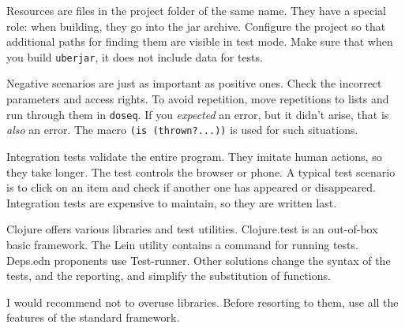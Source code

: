 Resources are files in the project folder of the same name. They have a special role: when building, they go into the jar archive. Configure the project so that additional paths for finding them are visible in test mode. Make sure that when you build \verb|uberjar|, it does not include data for tests.

Negative scenarios are just as important as positive ones. Check the incorrect parameters and access rights. To avoid repetition, move repetitions to lists and run through them in \verb|doseq|. If you \emph{expected} an error, but it didn't arise, that is \emph{also} an error. The macro \verb|(is (thrown?...))| is used for such situations.

Integration tests validate the entire program. They imitate human actions, so they take longer. The test controls the browser or phone. A typical test scenario is to click on an item and check if another one has appeared or disappeared. Integration tests are expensive to maintain, so they are written last.

Clojure offers various libraries and test utilities. Clojure.test is an out-of-box basic framework. The Lein utility contains a command for running tests. Deps.edn proponents use Test-runner. Other solutions change the syntax of the tests, and the reporting, and simplify the substitution of functions.

I would recommend not to overuse libraries. Before resorting to them, use all the features of the standard framework.
